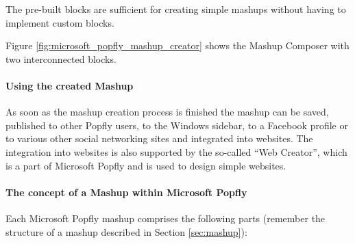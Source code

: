 The pre-built blocks are sufficient for creating simple mashups without having to implement custom
blocks.

Figure \ref{fig:microsoft_popfly_mashup_creator} shows the Mashup Composer with two interconnected
blocks.

\paragraph{Using the created Mashup}
As soon as the mashup creation process is finished the mashup can be saved, published to other
Popfly users, to the Windows sidebar, to a Facebook profile or to various other social networking sites and
integrated into websites. The integration into websites is also supported by the so-called ``Web
Creator'', which is a part of Microsoft Popfly and is used to design simple websites.

\paragraph{The concept of a Mashup within Microsoft Popfly}
Each Microsoft Popfly mashup comprises the following parts (remember the
structure of a mashup described in Section \ref{sec:mashup}):

